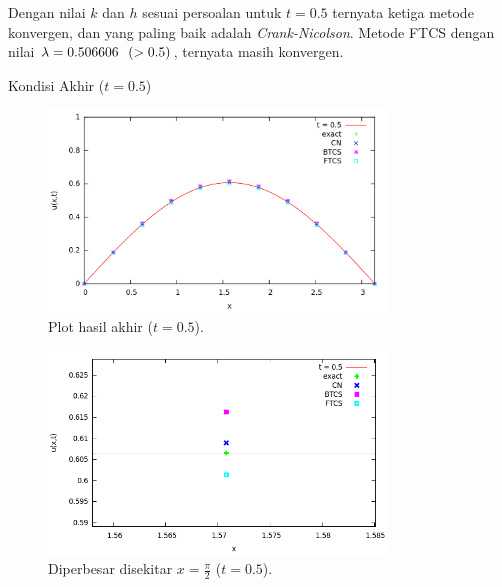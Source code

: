 \documentclass[paper=a4, fontsize=11pt]{scrartcl}
\numberwithin{equation}{section} %
\numberwithin{figure}{section} %
\numberwithin{table}{section} %
\begin{document}
Dengan nilai $k$ dan $h$ sesuai persoalan untuk $t = 0.5$ ternyata ketiga metode konvergen, dan yang paling baik adalah \textit{Crank-Nicolson}. Metode FTCS dengan nilai $\lambda = 0.506606 \hspace{0.25cm} (> 0.5)$, ternyata masih konvergen.

\newpage
Kondisi Akhir ($t = 0.5$)
\begin{figure}
	\centering
	\includegraphics[width=0.8\textwidth]
		{plot.png}
	\caption{Plot hasil akhir ($t = 0.5$).}
\end{figure}

\begin{figure}
	\centering
	\includegraphics[width=0.8\textwidth]
		{zoom.png}
	\caption{Diperbesar disekitar $x = \frac{\pi}{2}$ ($t = 0.5$).}
\end{figure}
\end{document}
